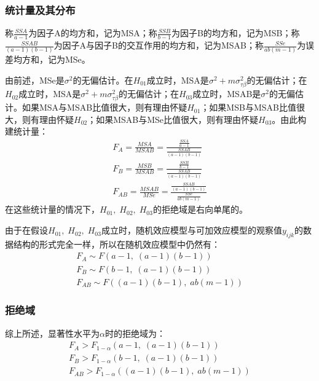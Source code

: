 \subsubsection{统计量及其分布}
称$\frac{SSA}{a-1}$为因子A的均方和，记为MSA；称$\frac{SSB}{b-1}$为因子B的均方和，记为MSB；称$\frac{SSAB}{(a-1)(b-1)}$为因子A与因子B的交互作用的均方和，记为MSAB；称$\frac{SSe}{ab(m-1)}$为误差均方和，记为MSe。\par
由前述，MSe是$\sigma^2$的无偏估计。在$H_{01}$成立时，MSA是$\sigma^2+m\sigma_{\tau\beta}^2$的无偏估计；在$H_{02}$成立时，MSA是$\sigma^2+m\sigma_{\tau\beta}^2$的无偏估计；在$H_{03}$成立时，MSAB是$\sigma^2$的无偏估计。如果MSA与MSAB比值很大，则有理由怀疑$H_01$；如果MSB与MSAB比值很大，则有理由怀疑$H_02$；如果MSAB与MSe比值很大，则有理由怀疑$H_03$。由此构建统计量：
\begin{gather*}
	F_A=\frac{MSA}{MSAB}=\frac{\frac{SSA}{a-1}}{\frac{SSAB}{(a-1)(b-1)}} \\
	F_B=\frac{MSB}{MSAB}=\frac{\frac{SSB}{b-1}}{\frac{SSAB}{(a-1)(b-1)}} \\
	F_{AB}=\frac{MSAB}{MSe}=\frac{\frac{SSAB}{(a-1)(b-1)}}{\frac{SSe}{ab(m-1)}}
\end{gather*}
在这些统计量的情况下，$H_{01},\;H_{02},\;H_{03}$的拒绝域是右向单尾的。\par
由于在假设$H_{01},\;H_{02},\;H_{03}$成立时，随机效应模型与可加效应模型的观察值$y_{ijk}$的数据结构的形式完全一样，所以在随机效应模型中仍然有：
\begin{gather*}
	F_A\sim F(a-1,\;(a-1)(b-1)) \\
	F_B\sim F(b-1,\;(a-1)(b-1)) \\
	F_{AB}\sim F((a-1)(b-1),\;ab(m-1))
\end{gather*}
\subsubsection{拒绝域}
综上所述，显著性水平为$\alpha$时的拒绝域为：
\begin{gather*}
	F_A>F_{1-\alpha}(a-1,\;(a-1)(b-1)) \\
	F_B>F_{1-\alpha}(b-1,\;(a-1)(b-1)) \\
	F_{AB}>F_{1-\alpha}((a-1)(b-1),\;ab(m-1))
\end{gather*}

